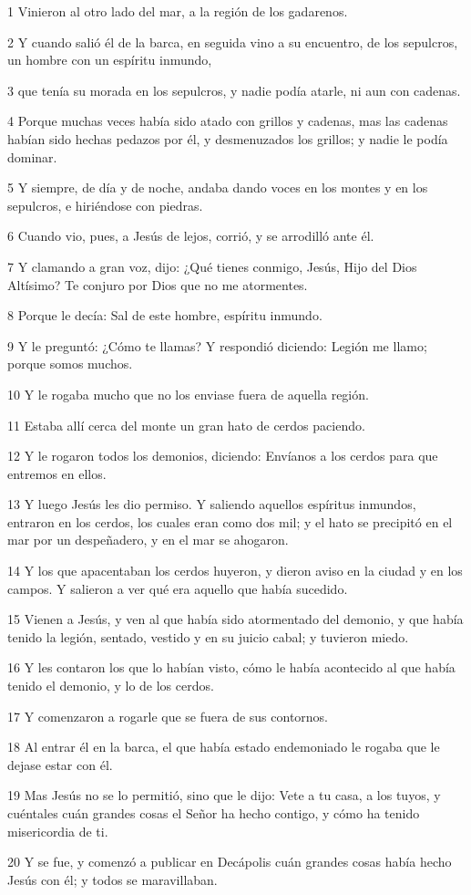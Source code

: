 \par 1 Vinieron al otro lado del mar, a la región de los gadarenos.
\par 2 Y cuando salió él de la barca, en seguida vino a su encuentro, de los sepulcros, un hombre con un espíritu inmundo,
\par 3 que tenía su morada en los sepulcros, y nadie podía atarle, ni aun con cadenas.
\par 4 Porque muchas veces había sido atado con grillos y cadenas, mas las cadenas habían sido hechas pedazos por él, y desmenuzados los grillos; y nadie le podía dominar.
\par 5 Y siempre, de día y de noche, andaba dando voces en los montes y en los sepulcros, e hiriéndose con piedras.
\par 6 Cuando vio, pues, a Jesús de lejos, corrió, y se arrodilló ante él.
\par 7 Y clamando a gran voz, dijo: ¿Qué tienes conmigo, Jesús, Hijo del Dios Altísimo? Te conjuro por Dios que no me atormentes.
\par 8 Porque le decía: Sal de este hombre, espíritu inmundo.
\par 9 Y le preguntó: ¿Cómo te llamas? Y respondió diciendo: Legión me llamo; porque somos muchos.
\par 10 Y le rogaba mucho que no los enviase fuera de aquella región.
\par 11 Estaba allí cerca del monte un gran hato de cerdos paciendo.
\par 12 Y le rogaron todos los demonios, diciendo: Envíanos a los cerdos para que entremos en ellos.
\par 13 Y luego Jesús les dio permiso. Y saliendo aquellos espíritus inmundos, entraron en los cerdos, los cuales eran como dos mil; y el hato se precipitó en el mar por un despeñadero, y en el mar se ahogaron.
\par 14 Y los que apacentaban los cerdos huyeron, y dieron aviso en la ciudad y en los campos. Y salieron a ver qué era aquello que había sucedido.
\par 15 Vienen a Jesús, y ven al que había sido atormentado del demonio, y que había tenido la legión, sentado, vestido y en su juicio cabal; y tuvieron miedo.
\par 16 Y les contaron los que lo habían visto, cómo le había acontecido al que había tenido el demonio, y lo de los cerdos.
\par 17 Y comenzaron a rogarle que se fuera de sus contornos.
\par 18 Al entrar él en la barca, el que había estado endemoniado le rogaba que le dejase estar con él.
\par 19 Mas Jesús no se lo permitió, sino que le dijo: Vete a tu casa, a los tuyos, y cuéntales cuán grandes cosas el Señor ha hecho contigo, y cómo ha tenido misericordia de ti.
\par 20 Y se fue, y comenzó a publicar en Decápolis cuán grandes cosas había hecho Jesús con él; y todos se maravillaban.

